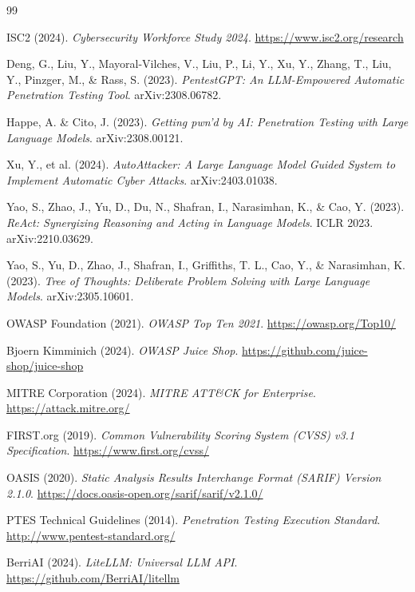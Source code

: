 \documentclass[12pt,a4paper]{article}
\begin{document}
\begin{thebibliography}{99}

ISC2 (2024).
\textit{Cybersecurity Workforce Study 2024}.
\url{https://www.isc2.org/research}

Deng, G., Liu, Y., Mayoral-Vilches, V., Liu, P., Li, Y., Xu, Y., Zhang, T., Liu, Y., Pinzger, M., \& Rass, S. (2023).
\textit{PentestGPT: An LLM-Empowered Automatic Penetration Testing Tool}.
arXiv:2308.06782.

Happe, A. \& Cito, J. (2023).
\textit{Getting pwn'd by AI: Penetration Testing with Large Language Models}.
arXiv:2308.00121.

Xu, Y., et al. (2024).
\textit{AutoAttacker: A Large Language Model Guided System to Implement Automatic Cyber Attacks}.
arXiv:2403.01038.

Yao, S., Zhao, J., Yu, D., Du, N., Shafran, I., Narasimhan, K., \& Cao, Y. (2023).
\textit{ReAct: Synergizing Reasoning and Acting in Language Models}.
ICLR 2023. arXiv:2210.03629.

Yao, S., Yu, D., Zhao, J., Shafran, I., Griffiths, T. L., Cao, Y., \& Narasimhan, K. (2023).
\textit{Tree of Thoughts: Deliberate Problem Solving with Large Language Models}.
arXiv:2305.10601.

OWASP Foundation (2021).
\textit{OWASP Top Ten 2021}.
\url{https://owasp.org/Top10/}

Bjoern Kimminich (2024).
\textit{OWASP Juice Shop}.
\url{https://github.com/juice-shop/juice-shop}

MITRE Corporation (2024).
\textit{MITRE ATT\&CK for Enterprise}.
\url{https://attack.mitre.org/}

FIRST.org (2019).
\textit{Common Vulnerability Scoring System (CVSS) v3.1 Specification}.
\url{https://www.first.org/cvss/}

OASIS (2020).
\textit{Static Analysis Results Interchange Format (SARIF) Version 2.1.0}.
\url{https://docs.oasis-open.org/sarif/sarif/v2.1.0/}

PTES Technical Guidelines (2014).
\textit{Penetration Testing Execution Standard}.
\url{http://www.pentest-standard.org/}

BerriAI (2024).
\textit{LiteLLM: Universal LLM API}.
\url{https://github.com/BerriAI/litellm}

\end{thebibliography}
\end{document}
